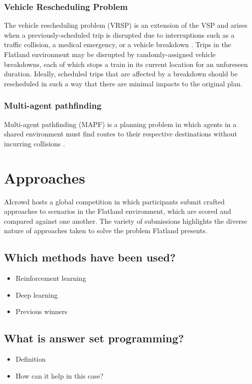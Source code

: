 \documentclass[11pt]{article}
\begin{document}
\subsubsection{Vehicle Rescheduling Problem}
The vehicle rescheduling problem (VRSP) is an extension of the VSP and arises when a previously-scheduled trip is disrupted due to interruptions such as a traffic collision, a medical emergency, or a vehicle breakdown \cite{limibo07a}.  Trips in the Flatland environment may be disrupted by randomly-assigned vehicle breakdowns, each of which stops a train in its current location for an unforeseen duration.  Ideally, scheduled trips that are affected by a breakdown should be rescheduled in such a way that there are minimal impacts to the original plan.

\subsubsection{Multi-agent pathfinding}
Multi-agent pathfinding (MAPF) is a planning problem in which agents in a shared environment must find routes to their respective destinations without incurring collisions \cite{silver05a}.


\pagebreak
\section{Approaches}
AIcrowd hosts a global competition in which participants submit crafted approaches to scenarios in the Flatland environment, which are scored and compared against one another.  The variety of submissions highlights the diverse nature of approaches taken to solve the problem Flatland presents.
\subsection{Which methods have been used?}
\begin{itemize}
  \item Reinforcement learning
  \item Deep learning
  \item Previous winners
\end{itemize}

\subsection{What is answer set programming?}
\begin{itemize}
  \item Definition
  \item How can it help in this case?
\end{itemize}
\end{document}
